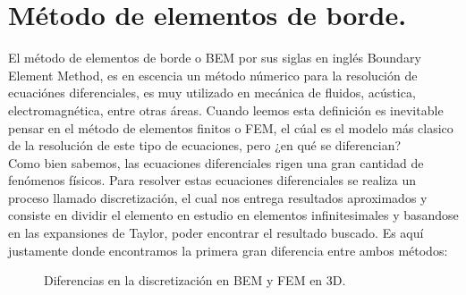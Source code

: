 \chapter{Método de elementos de borde.}\label{sec:BEM.}
\setcounter{figure}{0}
\setcounter{equation}{0}
El método de elementos de borde o BEM por sus siglas en inglés Boundary Element Method, es en escencia un método númerico para la resolución de ecuaciónes diferenciales, es muy utilizado en mecánica de fluidos, acústica, electromagnética, entre otras áreas. Cuando leemos esta definición es inevitable pensar en el método de elementos finitos o FEM, el cúal es el modelo más clasico de la resolución de este tipo de ecuaciones, pero ¿en qué se diferencian?\\
Como bien sabemos, las ecuaciones diferenciales rigen una gran cantidad de fenómenos físicos. Para resolver estas ecuaciones diferenciales se realiza un proceso llamado discretización, el cual nos entrega resultados aproximados y consiste en dividir el elemento en estudio en elementos infinitesimales y basandose en las expansiones de Taylor, poder encontrar el resultado buscado. Es aquí justamente donde encontramos la primera gran diferencia entre ambos métodos:
\begin{figure}[H]
\centering
\label{fig:Discretizacion BEM y FEM}
\caption{Diferencias en la discretización en BEM y FEM en 3D.}
\end{figure}
